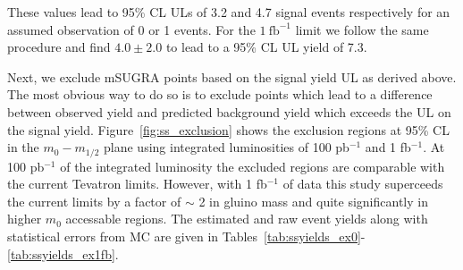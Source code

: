 These values lead to  95\% CL  ULs  of 3.2 and 4.7  signal  events respectively for an assumed 
observation of 0 or 1 events. For the $1~\mathrm{fb}^{-1}$ limit we follow the same procedure
and find $4.0 \pm 2.0$ to lead to a 95\% CL UL yield of 7.3.

Next, we  exclude mSUGRA  points based on the  signal yield UL as derived above. The most 
obvious  way to do  so is to  exclude points which  lead  to a  difference  between  
observed  yield and  predicted background yield  which exceeds the  UL on the signal  yield. 
Figure~\ref{fig:ss_exclusion} shows the exclusion regions at 
95\% CL in the $m_{0}-m_{1/2}$ plane using integrated luminosities of 100 pb$^{-1}$
and 1 fb$^{-1}$. At 100 pb$^{-1}$ of the integrated luminosity the excluded 
regions are comparable with the current Tevatron limits. However, with 1 fb$^{-1}$
of data this study superceeds the current limits by a factor of $\sim$ 2 in gluino 
mass and quite significantly in higher $m_{0}$ accessable regions. The estimated and raw 
event yields along with statistical errors from MC are given in 
Tables~\ref{tab:ssyields_ex0}-\ref{tab:ssyields_ex1fb}.



